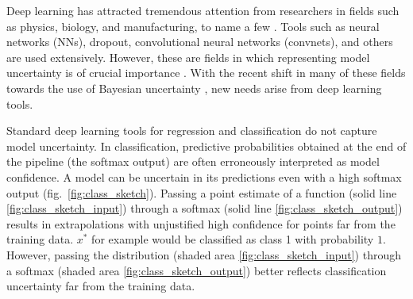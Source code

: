 \documentclass{article}
\theoremstyle{definition}
\begin{document}
Deep learning has attracted tremendous attention from researchers in fields such as physics, biology, and manufacturing, to name a few  \citep{baldi2014searching, anjos2015neural, bergmann2014use}. Tools such as neural networks (NNs), dropout, convolutional neural networks (convnets), and others are used extensively. However, these are fields in which representing model uncertainty is of crucial importance \citep{krzywinski2013points, ghahramani2015probabilistic}. With the recent shift in many of these fields towards the use of Bayesian uncertainty \citep{herzog2013experimental, Trafimow2015Editorial, nuzzo2014statistical}, new needs arise from deep learning tools. %

Standard deep learning tools for regression and classification do not capture model uncertainty. 
In classification, predictive probabilities obtained at the end of the pipeline (the softmax output) are often erroneously interpreted as model confidence. 
A model can be uncertain in its predictions even with a high softmax output (fig.\ \ref{fig:class_sketch}). 
Passing a point estimate of a function (solid line \ref{fig:class_sketch_input}) through a softmax (solid line \ref{fig:class_sketch_output}) results in extrapolations with unjustified high confidence for points far from the training data. $x^*$ for example would be classified as class 1 with probability $1$. However, passing the distribution (shaded area \ref{fig:class_sketch_input}) through a softmax (shaded area \ref{fig:class_sketch_output}) better reflects classification uncertainty far from the training data.
\end{document}
